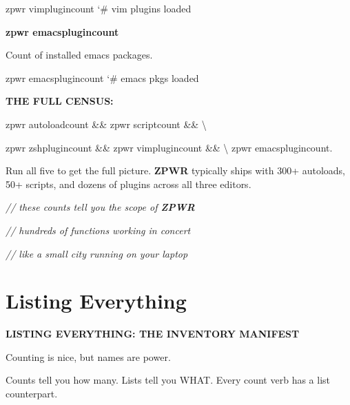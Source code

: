 \documentclass[11pt,a4paper,twoside]{book}
\begin{document}
\begin{codebox}
\color{neongreen}zpwr vimplugincount          {\char`\#} vim plugins loaded\\
\end{codebox}


\vspace{12pt}
{\bfseries\color{neonyellow} zpwr emacsplugincount}\vspace{4pt}

Count of installed emacs packages.

\begin{codebox}
\color{neongreen}zpwr emacsplugincount        {\char`\#} emacs pkgs loaded\\
\end{codebox}


\vspace{12pt}
{\bfseries\color{neonyellow} THE FULL CENSUS:}\vspace{4pt}

\begin{codebox}
\color{neongreen}zpwr autoloadcount \&\& zpwr scriptcount \&\& \textbackslash{}\\
\end{codebox}

zpwr zshplugincount \&\& zpwr vimplugincount \&\& \textbackslash{} zpwr emacsplugincount.

Run all five to get the full picture. \textbf{ZPWR} typically ships with 300+ autoloads, 50+ scripts, and dozens of plugins across all three editors.

{\small\itshape\color{dimtext} // these counts tell you the scope of \textbf{ZPWR}}

{\small\itshape\color{dimtext} // hundreds of functions working in concert}

{\small\itshape\color{dimtext} // like a small city running on your laptop}


\vspace{16pt}

\section{Listing Everything}


\vspace{10pt}
{\large\bfseries\color{neoncyan} LISTING EVERYTHING: THE INVENTORY MANIFEST}\vspace{6pt}

Counting is nice, but names are power.

Counts tell you how many. Lists tell you WHAT. Every count verb has a list counterpart.
\end{document}
